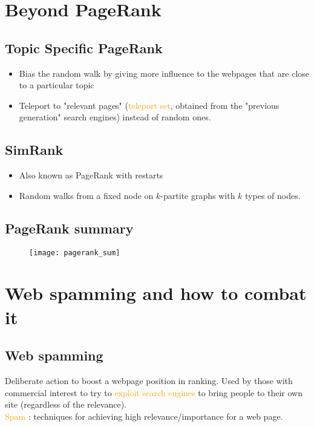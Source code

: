 \section{Beyond PageRank}

\subsection{Topic Specific PageRank}

\begin{itemize}
\item Bias the random walk by giving more influence to the webpages that are close to a particular topic
\item Teleport to "relevant pages" (\textcolor{orange}{teleport set}, obtained from the "previous generation" search engines) instead of random ones.
\end{itemize}

\subsection{SimRank}

\begin{itemize}
\item Also known as PageRank with restarts
\item Random walks from a fixed node on $k$-partite graphs with $k$ types of nodes.
\end{itemize}

\subsection{PageRank summary}

\begin{figure}[H]
    \centering
    \texttt{[image: pagerank\_sum]}
\end{figure}

\section{Web spamming and how to combat it}

\subsection{Web spamming}

Deliberate action to boost a webpage position in ranking. Used by those with commercial interest to try to \textcolor{orange}{exploit search engines} to bring people to their own site (regardless of the relevance).\\
\textcolor{orange}{Spam} : techniques for achieving high relevance/importance for a web page.

